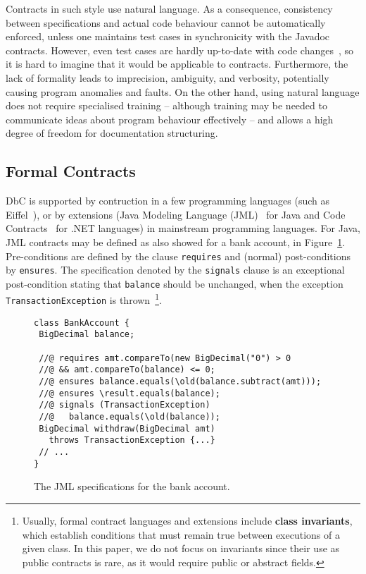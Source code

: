 Contracts in such style use natural language. As a consequence, consistency between specifications and actual code behaviour cannot be automatically enforced, unless one maintains test cases in synchronicity with the Javadoc contracts. However, even test cases are hardly up-to-date with code changes~\cite{Hao2013}, so it is hard to imagine that it would be applicable to contracts. 
Furthermore, the lack of formality leads to imprecision, ambiguity, and verbosity, potentially causing program anomalies and faults.
On the other hand, using natural language does not require specialised training -- although training may be needed to communicate
ideas about program behaviour effectively -- and allows a high degree of freedom for documentation structuring. 


\subsection{Formal Contracts}


DbC is supported by contruction in a few programming languages (such as Eiffel~\cite{eiffel}), or by extensions (Java Modeling Language (JML)~\cite{jml} for Java and Code Contracts~\cite{codeContractsPaper} for .NET languages) in mainstream programming languages.
For Java, JML contracts may be defined as also showed for a bank account, in Figure~\ref{Fig-JML-Bank}. Pre-conditions
are defined by the clause {\lstinline!requires!} and (normal) post-conditions by {\lstinline!ensures!}. The specification
denoted by the {\lstinline!signals!} clause
is an exceptional post-condition stating that {\lstinline!balance!} should be unchanged, when the exception \texttt{TransactionExcep\-tion} is thrown~\footnote{Usually, formal contract languages and extensions include \textbf{class invariants}, which establish conditions that must remain true between executions of a given class. In this paper, we do not focus on invariants since their use as public contracts is rare, as it would require public or abstract fields.}.

\begin{figure}
\begin{lstlisting}[basicstyle=\footnotesize\ttfamily,name=figxpi]
class BankAccount {
 BigDecimal balance;

 //@ requires amt.compareTo(new BigDecimal("0") > 0 
 //@ && amt.compareTo(balance) <= 0;
 //@ ensures balance.equals(\old(balance.subtract(amt)));
 //@ ensures \result.equals(balance);
 //@ signals (TransactionException) 
 //@   balance.equals(\old(balance));
 BigDecimal withdraw(BigDecimal amt) 
   throws TransactionException {...}
 // ...
}
\end{lstlisting}
\caption{The JML specifications for the bank account.}
\label{Fig-JML-Bank}
\end{figure}

